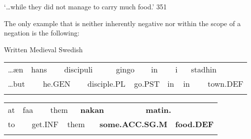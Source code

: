 \begin{styleTranslation}
 ‘…while they did not manage to carry much food.’ 351

\end{styleTranslation}

\begin{styleBodyTextFirst}
The only example that is neither inherently negative nor within the scope of a negation is the following:

\end{styleBodyTextFirst}

\begin{listWWNumileveli}
\item {}

\begin{styleExample}
\label{bkm:Ref78603365}Written Medieval Swedish

\end{styleExample}

\end{listWWNumileveli}

\begin{tabular}{llllllllllllll}
\lsptoprule
…æn & \multicolumn{2}{l}{hans

} & \multicolumn{2}{l}{discipuli

} & \multicolumn{2}{l}{gingo

} & \multicolumn{2}{l}{in

} & \multicolumn{2}{l}{i

} & \multicolumn{2}{l}{stadhin

} & \\
\multicolumn{2}{l}{…but

} & \multicolumn{2}{l}{he.GEN

} & \multicolumn{2}{l}{disciple.PL

} & \multicolumn{2}{l}{go.PST

} & \multicolumn{2}{l}{in

} & \multicolumn{2}{l}{in

} & \multicolumn{2}{l}{town.DEF

}\\
\lspbottomrule
\end{tabular}

\begin{tabular}{llllllllll}
\lsptoprule
at & \multicolumn{2}{l}{faa

} & \multicolumn{2}{l}{them

} & \multicolumn{2}{l}{{\bfseries nakan}

} & \multicolumn{2}{l}{{\bfseries matin.}

} & \\
\multicolumn{2}{l}{to

} & \multicolumn{2}{l}{get.INF

} & \multicolumn{2}{l}{them

} & \multicolumn{2}{l}{{\bfseries some.ACC.SG.M}

} & \multicolumn{2}{l}{{\bfseries food.DEF}

}\\
\lspbottomrule
\end{tabular}

